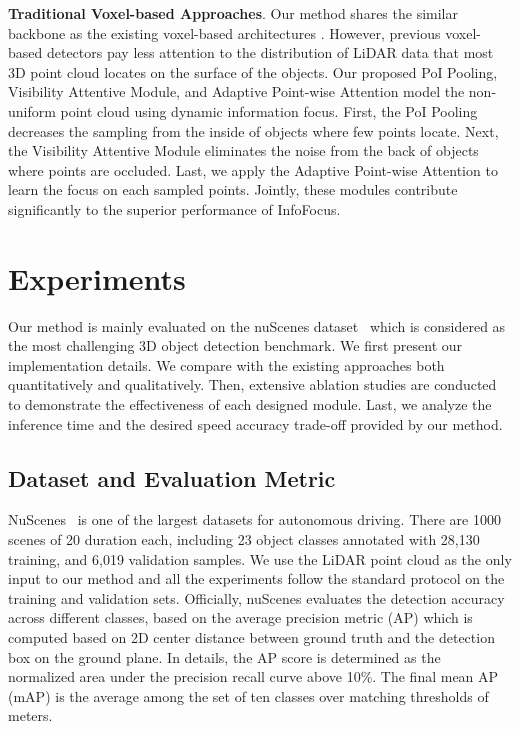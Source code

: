 \documentclass[runningheads]{llncs}
\begin{document}
\noindent\textbf{Traditional Voxel-based Approaches}. Our method shares the similar backbone as the existing voxel-based architectures \cite{lang2019PointPillars,zhou2018voxelnet,yan2018second,ye2020sarpnet}. However, previous voxel-based detectors pay less attention to the distribution of LiDAR data that most 3D point cloud locates on the surface of the objects. Our proposed PoI Pooling, Visibility Attentive Module, and Adaptive Point-wise Attention model the non-uniform point cloud using dynamic information focus. First, the PoI Pooling decreases the sampling from the inside of objects where few points locate. Next, the Visibility Attentive Module eliminates the noise from the back of objects where points are occluded. Last, we apply the Adaptive Point-wise Attention to learn the focus on each sampled points. Jointly, these modules contribute significantly to the superior performance of InfoFocus.

\section{Experiments}
Our method is mainly evaluated on the nuScenes dataset~\cite{caesar2019nuscenes} which is considered as the most challenging 3D object detection benchmark. We first present our implementation details. We compare with the existing approaches both quantitatively and qualitatively. Then, extensive ablation studies are conducted to demonstrate the effectiveness of each designed module. Last, we analyze the inference time and the desired speed accuracy trade-off provided by our method.


\subsection{Dataset and Evaluation Metric}
NuScenes~\cite{caesar2019nuscenes} is one of the largest datasets for autonomous driving. There are 1000 scenes of 20 duration each, including 23 object classes annotated with 28,130 training, and 6,019 validation samples. We use the LiDAR point cloud as the only input to our method and all the experiments follow the standard protocol on the training and validation sets. Officially, nuScenes evaluates the detection accuracy across different classes, based on the average precision metric (AP) which is computed based on 2D center distance between ground truth and the detection box on the ground plane. In details, the AP score is determined as the normalized area under the precision recall curve above 10\%. The final mean AP (mAP) is the average among the set of ten classes over matching thresholds of  meters.
\end{document}
